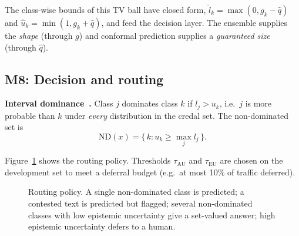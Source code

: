 \documentclass[11pt,a4paper]{article}
\newcommand{\AU}{\mathrm{AU}}
\newcommand{\EU}{\mathrm{EU}}
\newcommand{\ND}{\mathrm{ND}}
\begin{document}
The class-wise bounds of this TV ball have closed form, $\hat l_k = \max(0, g_k - \hat q)$
and $\hat u_k = \min(1, g_k + \hat q)$, and feed the decision layer. The ensemble supplies
the \emph{shape} (through $g$) and conformal prediction supplies a \emph{guaranteed size}
(through $\hat q$).

\subsection{M8: Decision and routing}\label{sec:m8}

\textbf{Interval dominance~\cite{troffaes2007}.} Class $j$ dominates class $k$ if
$l_j > u_k$, i.e.\ $j$ is more probable than $k$ under \emph{every} distribution in the
credal set. The non-dominated set is
\begin{equation}
  \ND(x) = \{\, k : u_k \ge \max_j l_j \,\}.
\end{equation}

Figure~\ref{fig:route} shows the routing policy. Thresholds $\tau_{\AU}$ and $\tau_{\EU}$
are chosen on the development set to meet a deferral budget (e.g.\ at most 10\% of traffic
deferred).

\begin{figure}[ht]
\centering
{}
\caption{Routing policy. A single non-dominated class is predicted; a contested text is
predicted but flagged; several non-dominated classes with low epistemic uncertainty give a
set-valued answer; high epistemic uncertainty defers to a human.}
\label{fig:route}
\end{figure}
\end{document}
